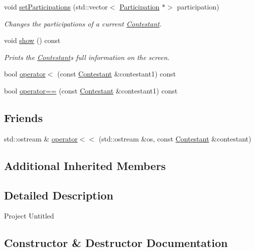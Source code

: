 \begin{DoxyCompactItemize}
void \hyperlink{class_contestant_a0ca184f1d5064ad78e7b5f643c8e4f42}{set\+Participations} (std\+::vector$<$ \hyperlink{class_participation}{Participation} $\ast$$>$ participation)
\begin{DoxyCompactList}\small\item\em Changes the participations of a current \hyperlink{class_contestant}{Contestant}. \end{DoxyCompactList}\item 
\mbox{\label{class_contestant_a7c89f356696d59b7ccb762d09451def3}} 
void \hyperlink{class_contestant_a7c89f356696d59b7ccb762d09451def3}{show} () const
\begin{DoxyCompactList}\small\item\em Prints the \hyperlink{class_contestant}{Contestant}\textquotesingle{}s full information on the screen. \end{DoxyCompactList}\item 
bool \hyperlink{class_contestant_ae51d0d7eb8a0cf2e70f0cfe92c74e7ae}{operator$<$} (const \hyperlink{class_contestant}{Contestant} \&contestant1) const
\item 
bool \hyperlink{class_contestant_a6d1d627ddf49dc5d3b77a6d42a3680fd}{operator==} (const \hyperlink{class_contestant}{Contestant} \&contestant1) const
\end{DoxyCompactItemize}
\subsection*{Friends}
\begin{DoxyCompactItemize}
\item 
std\+::ostream \& \hyperlink{class_contestant_af6619c3c4998b08f93ea4a4568201ebe}{operator$<$$<$} (std\+::ostream \&os, const \hyperlink{class_contestant}{Contestant} \&contestant)
\end{DoxyCompactItemize}
\subsection*{Additional Inherited Members}


\subsection{Detailed Description}
Project Untitled 

\subsection{Constructor \& Destructor Documentation}
\mbox{\label{class_contestant_a4f6ad68b8ea17d3cfc18581f62ea4806}} 
